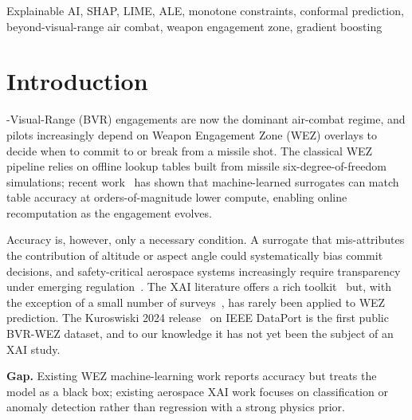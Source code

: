 \documentclass[conference]{IEEEtran}
\begin{document}
\begin{IEEEkeywords}
Explainable AI, SHAP, LIME, ALE, monotone constraints, conformal prediction, beyond-visual-range air combat, weapon engagement zone, gradient boosting
\end{IEEEkeywords}

\section{Introduction}
-Visual-Range (BVR) engagements are now the dominant air-combat regime, and pilots increasingly depend on Weapon Engagement Zone (WEZ) overlays to decide when to commit to or break from a missile shot. The classical WEZ pipeline relies on offline lookup tables built from missile six-degree-of-freedom simulations; recent work~\cite{kuroswiski2024,sutthithatip2021} has shown that machine-learned surrogates can match table accuracy at orders-of-magnitude lower compute, enabling online recomputation as the engagement evolves.

Accuracy is, however, only a necessary condition. A surrogate that mis-attributes the contribution of altitude or aspect angle could systematically bias commit decisions, and safety-critical aerospace systems increasingly require transparency under emerging regulation~\cite{ai_act_2024}. The XAI literature offers a rich toolkit~\cite{adadi2018,arrieta2020,molnar2022} but, with the exception of a small number of surveys~\cite{degas2022}, has rarely been applied to WEZ prediction. The Kuroswiski 2024 release~\cite{kuroswiski2024} on IEEE DataPort is the first public BVR-WEZ dataset, and to our knowledge it has not yet been the subject of an XAI study.

\textbf{Gap.} Existing WEZ machine-learning work reports accuracy but treats the model as a black box; existing aerospace XAI work focuses on classification or anomaly detection rather than regression with a strong physics prior.
\end{document}
